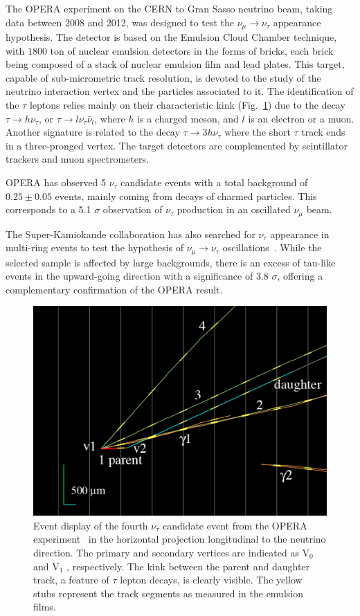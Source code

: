 The OPERA experiment on the CERN to Gran Sasso neutrino beam, taking data between 2008 and 2012, was designed to test the $\nu_\mu \rightarrow \nu_\tau$ appearance hypothesis. The detector is based on the Emulsion Cloud Chamber technique, with 1800 ton of nuclear emulsion detectors in the forms of bricks, each brick being composed of a stack of nuclear emulsion film and lead plates. This target, capable of sub-micrometric track resolution, is devoted to the study of the neutrino interaction vertex and the particles associated to it. The identification of the $\tau$ leptons relies mainly on their characteristic kink (Fig.~\ref{fig:opera}) due to the decay $\tau \rightarrow h \nu_\tau$, or $\tau \rightarrow l \nu_\tau \bar \nu_l$, where $h$ is a charged meson, and $l$ is an electron or a muon. Another signature is related to the decay $\tau \rightarrow 3 h \nu_\tau$ where the short $\tau$ track ends in a three-pronged vertex. The target detectors are complemented by scintillator trackers and muon spectrometers. 

OPERA has observed 5 $\nu_\tau$ candidate events \cite{Agafonova:2015jxn} with a total background of 
$0.25 \pm 0.05$ events, mainly coming from decays of charmed particles. This corresponds to a 5.1 $\sigma$ observation of $\nu_\tau$ production in an oscillated $\nu_\mu$ beam. 

The Super-Kamiokande collaboration has also searched for $\nu_\tau$ appearance in multi-ring events to test the hypothesis of $\nu_\mu \rightarrow \nu_\tau$ oscillations~\cite{Abe:2012jj}. While the selected sample is affected by large backgrounds, there is an excess of tau-like events in the upward-going direction with a significance of 3.8 $\sigma$, offering a complementary confirmation of the OPERA result.  
 
\begin{figure}[htbp]
\centering
\includegraphics[width=0.6\linewidth]{figures/tau4.pdf}
  \caption{
Event display of the fourth $\nu_\tau$ candidate event from the OPERA 
experiment~\cite{DICRESCENZO2015186} in the
horizontal projection longitudinal to the neutrino direction.
The primary and secondary vertices are indicated as V$_0$ and
V$_1$ , respectively. The kink between the parent and daughter track, a feature of $\tau$ lepton decays, is clearly visible. The yellow stubs represent the track segments as measured in the emulsion films.  
}
 \label{fig:opera}
 \end{figure}

